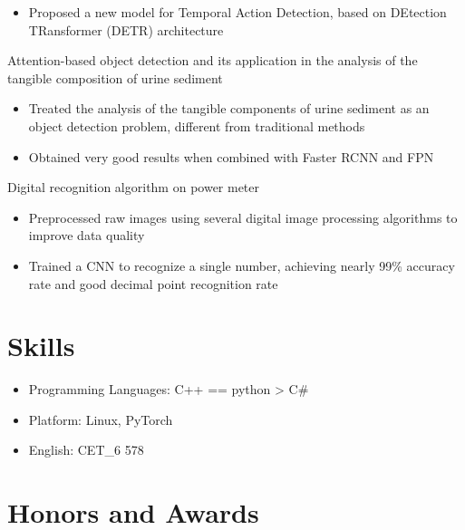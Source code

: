 \documentclass{resume}
\begin{document}
\begin{itemize}
  \item Proposed a new model for Temporal Action Detection, based on DEtection TRansformer (DETR) architecture
\end{itemize}

Attention-based object detection and its application in the analysis of the tangible composition of urine sediment
\begin{itemize}
  \item Treated the analysis of the tangible components of urine sediment as an object detection problem, different from traditional methods
  \item Obtained very good results when combined with Faster RCNN and FPN
\end{itemize}

Digital recognition algorithm on power meter
\begin{itemize}
  \item Preprocessed raw images using several digital image processing algorithms to improve data quality
  \item Trained a CNN to recognize a single number, achieving nearly 99\% accuracy rate and good decimal point recognition rate
\end{itemize}


\section{Skills}
\begin{itemize}
  \item Programming Languages: C++ == python > C\#
  \item Platform: Linux, PyTorch
  \item English: CET\_6 578
\end{itemize}

\section{Honors and Awards}

%
%
\end{document}
